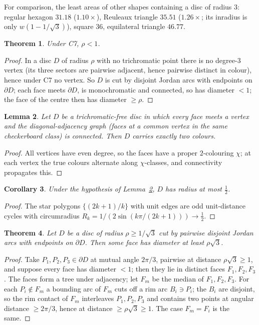 \documentclass[11pt,a4paper]{amsart}
\newtheorem{theorem}{Theorem}[section]
\newtheorem{lemma}[theorem]{Lemma}
\newtheorem{corollary}[theorem]{Corollary}
\theoremstyle{remark}
\begin{document}
For comparison, the least areas of other shapes containing a disc of radius $3$: regular hexagon $31.18$ ($1.10\times$), Reuleaux triangle $35.51$ ($1.26\times$; its inradius is only $w(1-1/\sqrt3)$), square $36$, equilateral triangle $46.77$.

\begin{theorem}\label{thm:rho1}
Under C7, $\rho<1$.
\end{theorem}
\begin{proof}
In a disc $D$ of radius $\rho$ with no trichromatic point there is no degree-$3$ vertex (its three sectors are pairwise adjacent, hence pairwise distinct in colour), hence under C7 no vertex. So $D$ is cut by disjoint Jordan arcs with endpoints on $\partial D$; each face meets $\partial D$, is monochromatic and connected, so has diameter $<1$; the face of the centre then has diameter $\ge\rho$.
\end{proof}

\begin{lemma}\label{lem:twocol}
Let $D$ be a trichromatic-free disc in which every face meets a vertex and the diagonal-adjacency graph (faces at a common vertex in the same checkerboard class) is connected. Then $D$ carries exactly two colours.
\end{lemma}
\begin{proof}
All vertices have even degree, so the faces have a proper $2$-colouring $\chi$; at each vertex the true colours alternate along $\chi$-classes, and connectivity propagates this.
\end{proof}

\begin{corollary}\label{cor:half}
Under the hypothesis of Lemma~\ref{lem:twocol}, $D$ has radius at most $\tfrac12$.
\end{corollary}
\begin{proof}
The star polygons $\{(2k+1)/k\}$ with unit edges are odd unit-distance cycles with circumradius $R_k=1/(2\sin(k\pi/(2k+1)))\to\tfrac12$.
\end{proof}

\begin{theorem}\label{thm:chords}
Let $D$ be a disc of radius $\rho\ge1/\sqrt3$ cut by pairwise disjoint Jordan arcs with endpoints on $\partial D$. Then some face has diameter at least $\rho\sqrt3$.
\end{theorem}
\begin{proof}
Take $P_1,P_2,P_3\in\partial D$ at mutual angle $2\pi/3$, pairwise at distance $\rho\sqrt3\ge1$, and suppose every face has diameter $<1$; then they lie in distinct faces $F_1,F_2,F_3$. The faces form a tree under adjacency; let $F_m$ be the median of $F_1,F_2,F_3$. For each $P_i\notin F_m$ a bounding arc of $F_m$ cuts off a rim arc $B_i\ni P_i$; the $B_i$ are disjoint, so the rim contact of $F_m$ interleaves $P_1,P_2,P_3$ and contains two points at angular distance $\ge2\pi/3$, hence at distance $\ge\rho\sqrt3\ge1$. The case $F_m=F_i$ is the same.
\end{proof}
\end{document}
